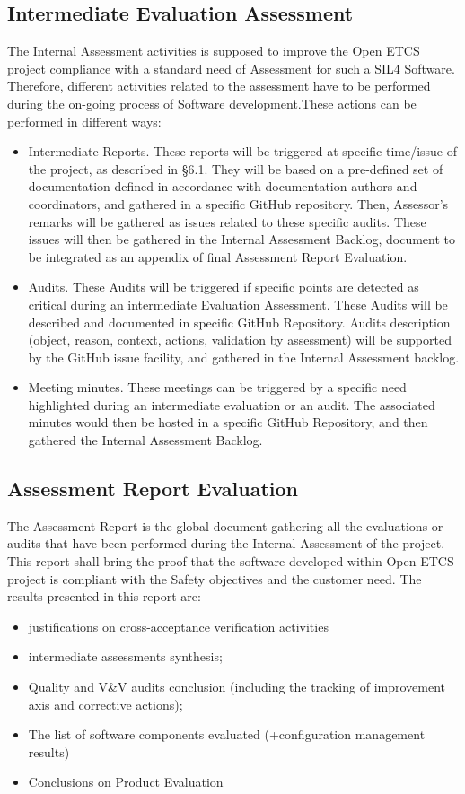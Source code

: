 \documentclass{template/openetcs_article}
\begin{document}
\subsection{Intermediate Evaluation Assessment}
The Internal Assessment activities is supposed to improve the Open ETCS project compliance with a standard need of Assessment for such a SIL4 Software. Therefore, different activities related to the assessment have to be performed during the on-going process of Software development.These actions can be performed in different ways:
\begin{itemize}
\item Intermediate Reports. These reports will be triggered at specific time/issue of the project, as described in §6.1. They will be based on a pre-defined set of documentation defined in accordance with documentation authors and coordinators, and gathered in a specific GitHub repository. Then, Assessor's remarks will be gathered as issues related to these specific audits. These issues will then be gathered in the Internal Assessment Backlog, document to be integrated as an appendix of final Assessment Report Evaluation.
\item Audits. These Audits will be triggered if specific points are detected as critical during an intermediate Evaluation Assessment. These Audits will be described and documented in specific GitHub Repository. Audits description (object, reason, context, actions, validation by assessment) will be supported by the GitHub issue facility, and gathered in the Internal Assessment backlog.
\item Meeting minutes. These meetings can be triggered by a specific need highlighted during an intermediate evaluation or an audit. The associated minutes would then be hosted in a specific GitHub Repository, and then gathered the Internal Assessment Backlog.
\end{itemize}


\subsection{Assessment Report Evaluation}
The Assessment Report is the global document gathering all the evaluations or audits that have been performed during the Internal Assessment of the project.
This report shall bring the proof that the software developed within Open ETCS project is compliant with the Safety objectives and the customer need.
The results presented in this report are:
 \begin{itemize}
\item justifications on cross-acceptance verification activities
\item intermediate assessments synthesis;
\item Quality and V\&V audits conclusion (including the tracking of improvement axis and corrective actions);
\item The list of software components evaluated (+configuration management results)
\item Conclusions on Product Evaluation
\end{itemize}
\end{document}

